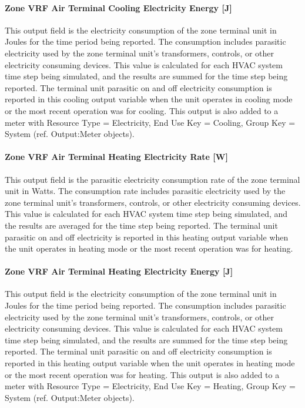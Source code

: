 \paragraph{Zone VRF Air Terminal Cooling Electricity Energy {[}J{]}}\label{zone-vrf-air-terminal-cooling-electric-energy-j}

This output field is the electricity consumption of the zone terminal unit in Joules for the time period being reported. The consumption includes parasitic electricity used by the zone terminal unit's transformers, controls, or other electricity consuming devices. This value is calculated for each HVAC system time step being simulated, and the results are summed for the time step being reported. The terminal unit parasitic on and off electricity consumption is reported in this cooling output variable when the unit operates in cooling mode or the most recent operation was for cooling. This output is also added to a meter with Resource Type = Electricity, End Use Key = Cooling, Group Key = System (ref. Output:Meter objects).

\paragraph{Zone VRF Air Terminal Heating Electricity Rate {[}W{]}}\label{zone-vrf-air-terminal-heating-electric-powerw}

This output field is the parasitic electricity consumption rate of the zone terminal unit in Watts. The consumption rate includes parasitic electricity used by the zone terminal unit's transformers, controls, or other electricity consuming devices. This value is calculated for each HVAC system time step being simulated, and the results are averaged for the time step being reported. The terminal unit parasitic on and off electricity is reported in this heating output variable when the unit operates in heating mode or the most recent operation was for heating.

\paragraph{Zone VRF Air Terminal Heating Electricity Energy {[}J{]}}\label{zone-vrf-air-terminal-heating-electric-energy-j}

This output field is the electricity consumption of the zone terminal unit in Joules for the time period being reported. The consumption includes parasitic electricity used by the zone terminal unit's transformers, controls, or other electricity consuming devices. This value is calculated for each HVAC system time step being simulated, and the results are summed for the time step being reported. The terminal unit parasitic on and off electricity consumption is reported in this heating output variable when the unit operates in heating mode or the most recent operation was for heating. This output is also added to a meter with Resource Type = Electricity, End Use Key = Heating, Group Key = System (ref. Output:Meter objects).

